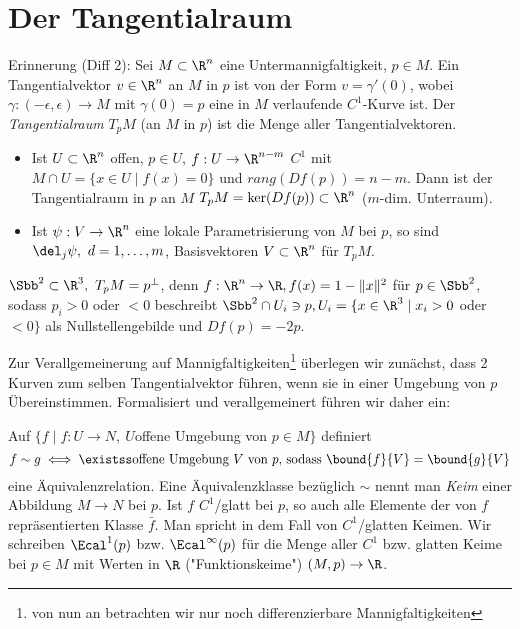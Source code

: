 \chapter{Der Tangentialraum}\lecture

Erinnerung (Diff 2): Sei $ M \subset \R^n $ eine Untermannigfaltigkeit, $p \in M$. Ein Tangentialvektor $v \in \R^n$ an $M$ in $p$ ist von der Form $ v = \gamma'(0) $, wobei $ \gamma: (-\epsilon,\epsilon) \to M $ mit $\gamma(0) = p$ eine in $M$ verlaufende $C^1$-Kurve ist. Der \emph{Tangentialraum} $T_pM$ (an $M$ in $p$) ist die Menge aller Tangentialvektoren. 
\begin{itemize}
	\item Ist $ U \subset \R^n $ offen, $p \in U$, $f: U \to \R^{n-m}$ $C^1$ mit $ M \cap U = \{x \in U \mid f(x) = 0\} $ und $rang(Df(p)) = n-m.$ Dann ist der Tangentialraum in $p$ an $M$ $ T_pM = \ker(Df(p)) \subset \R^n $ ($m$-dim. Unterraum).
	\item Ist $ \psi: V \to \R^n $ eine lokale Parametrisierung von $M$ bei $p$, so sind $ \del_j\psi,\ d=1,\dotsc,m$, Basisvektoren $ V \subset \R^n $ für $ T_pM $.
\end{itemize}

\begin{exmp*}
	$ \Sbb^2 \subset \R^3,\ T_pM = p^\bot $, denn $ f: \R^n \to \R, f(x) = 1-\|x\|^2 $ für $ p \in \Sbb^2 $, sodass $p_i > 0$ oder $<0$ beschreibt $ \Sbb^2 \cap U_i \ni p, U_i = \{x \in \R^3 \mid x_i > 0 $ oder $ < 0\} $ als Nullstellengebilde und $ Df(p) = -2p. $
\end{exmp*}

Zur Verallgemeinerung auf Mannigfaltigkeiten\footnote{von nun an betrachten wir nur noch differenzierbare Mannigfaltigkeiten} überlegen wir zunächst, dass 2 Kurven zum selben Tangentialvektor führen, wenn sie in einer Umgebung von $p$ Übereinstimmen. Formalisiert und verallgemeinert führen wir daher ein:

\begin{defn}[Keime]
	Auf $ \{f \mid f: U \to N,\ U $offene Umgebung von $p \in M\} $ definiert 
	$$ f \sim g \iff \existss \text{offene Umgebung } V \ \text{von } p \text{, sodass } \bound{f}{V} = \bound{g}{V} $$
	eine Äquivalenzrelation. Eine Äquivalenzklasse bezüglich $\sim$ nennt man \emph{Keim} einer Abbildung $M \to N$ bei $p$. Ist $ f $ $C^1$/glatt bei $p$, so auch alle Elemente der von $f$ repräsentierten Klasse $\bar{f}$. Man spricht in dem Fall von $C^1$/glatten Keimen. Wir schreiben $ \Ecal^1(p) $ bzw. $\Ecal^\infty(p)$ für die Menge aller $C^1$ bzw. glatten Keime bei $p \in M$ mit Werten in $\R$ ("Funktionskeime") $ (M,p) \to \R $.
\end{defn}


